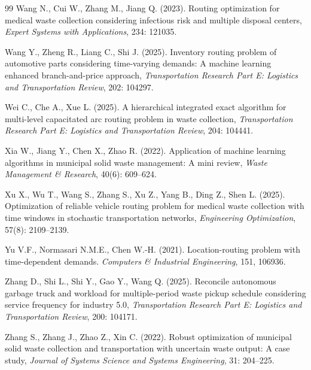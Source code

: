 \documentclass[authoryear,preprint,12pt]{elsarticle}
\begin{document}
\begin{thebibliography}{99}
Wang N., Cui W., Zhang M., Jiang Q. (2023). Routing optimization for medical waste collection considering infectious risk and multiple disposal centers, \textit{Expert Systems with Applications}, 234: 121035.

Wang Y., Zheng R., Liang C., Shi J. (2025). Inventory routing problem of automotive parts considering time-varying demands: A machine learning enhanced branch-and-price approach, \textit{Transportation Research Part E: Logistics and Transportation Review}, 202: 104297.

Wei C., Che A., Xue L. (2025). A hierarchical integrated exact algorithm for multi-level capacitated arc routing problem in waste collection, \textit{Transportation Research Part E: Logistics and Transportation Review}, 204: 104441.

Xia W., Jiang Y., Chen X., Zhao R. (2022). Application of machine learning algorithms in municipal solid waste management: A mini review, 
\textit{Waste Management \& Research}, 40(6): 609--624.

Xu X., Wu T., Wang S., Zhang S., Xu Z., Yang B., Ding Z., Shen L. (2025). Optimization of reliable vehicle routing problem for medical waste collection with time windows in stochastic transportation networks,
\textit{Engineering Optimization}, 57(8): 2109--2139.

Yu V.F., Normasari N.M.E., Chen W.-H. (2021).
Location-routing problem with time-dependent demands.
\textit{Computers \& Industrial Engineering}, 151, 106936.

Zhang D., Shi L.,  Shi Y., Gao Y., Wang Q. (2025). Reconcile autonomous garbage truck and workload for multiple-period waste pickup schedule considering service frequency for industry 5.0, \textit{Transportation Research Part E: Logistics and Transportation Review}, 200: 104171.

Zhang S., Zhang J., Zhao Z., Xin C. (2022). Robust optimization of municipal solid waste collection and transportation with uncertain waste output: A case study, \textit{Journal of Systems Science and Systems Engineering}, 31: 204--225.

\end{thebibliography}
\end{document}
